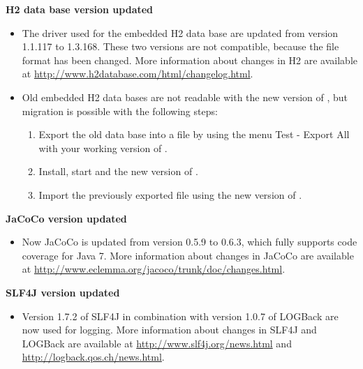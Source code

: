 %

\textbf{H2 data base version updated}
\begin{itemize}
\item The driver used for the embedded H2 data base are updated from version
    1.1.117 to 1.3.168. These two versions are not compatible, because the file format
    has been changed. More information about changes in H2 are
    available at \url{http://www.h2database.com/html/changelog.html}.
\item Old embedded H2 data bases are not readable with the new version
    of \ite, but migration is possible with the following steps:
    \begin{enumerate}
        \item Export the old data base into a file by using the menu
            Test - Export All with your working version of \ite.
        \item Install, start and the new version of \ite.
        \item Import the previously exported file using the new version
            of \ite.
    \end{enumerate}
\end{itemize}

\textbf{JaCoCo version updated}
\begin{itemize}
\item Now JaCoCo is updated from version 0.5.9 to 0.6.3, which fully supports
    code coverage for Java 7. More information about changes in JaCoCo are
    available at
    \url{http://www.eclemma.org/jacoco/trunk/doc/changes.html}.
\end{itemize}

\textbf{SLF4J version updated}
\begin{itemize}
\item Version 1.7.2 of SLF4J in combination with version 1.0.7 of LOGBack
    are now used for logging. More information about changes in SLF4J and
    LOGBack are available at
    \url{http://www.slf4j.org/news.html} and
    \url{http://logback.qos.ch/news.html}.
\end{itemize}
